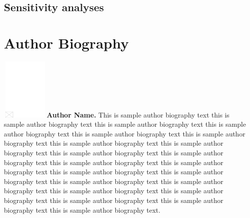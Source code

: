 \documentclass[AMA,STIX1COL]{WileyNJD-v2}\usepackage[]{graphicx}\usepackage[]{color}
\begin{document}

\subsection{Sensitivity analyses}



\nocite{*}%
%

\clearpage

\section*{Author Biography}

\begin{biography}{\includegraphics[width=66pt,height=86pt,draft]{empty}}{\textbf{Author Name.} This is sample author biography text this is sample author biography text this is sample author biography text this is sample author biography text this is sample author biography text this is sample author biography text this is sample author biography text this is sample author biography text this is sample author biography text this is sample author biography text this is sample author biography text this is sample author biography text this is sample author biography text this is sample author biography text this is sample author biography text this is sample author biography text this is sample author biography text this is sample author biography text this is sample author biography text this is sample author biography text this is sample author biography text.}
\end{biography}
\end{document}
